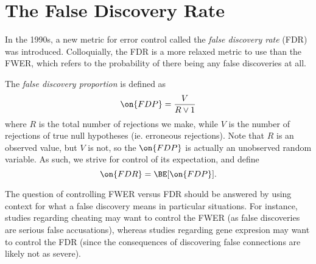 \documentclass[11pt,reqno]{report}
\theoremstyle{definition}
\numberwithin{equation}{section}
\begin{document}
\section{The False Discovery Rate} 
In the 1990s, a new metric for error control called the \emph{false discovery rate} (FDR) was introduced. Colloquially, the FDR is a more relaxed metric to use than the FWER, which refers to the probability of there being any false discoveries at all.
\begin{defn}
The \emph{false discovery proportion} is defined as
\begin{equation}
\on{FDP} = \frac{V}{R \vee 1}
\end{equation}
where $R$ is the total number of rejections we make, while $V$ is the number of rejections of true null hypotheses (ie. erroneous rejections). Note that $R$ is an observed value, but $V$ is not, so the $\on{FDP}$ is actually an unobserved random variable. As such, we strive for control of its expectation, and define
\begin{equation}
\on{FDR} = \BE[\on{FDP}].
\end{equation}

\end{defn}
The question of controlling FWER versus FDR should be answered by using context for what a false discovery means in particular situations. For instance, studies regarding cheating may want to control the FWER (as false discoveries are serious false accusations), whereas studies regarding gene expresion may want to control the FDR (since the consequences of discovering false connections are likely not as severe). 
\end{document}
